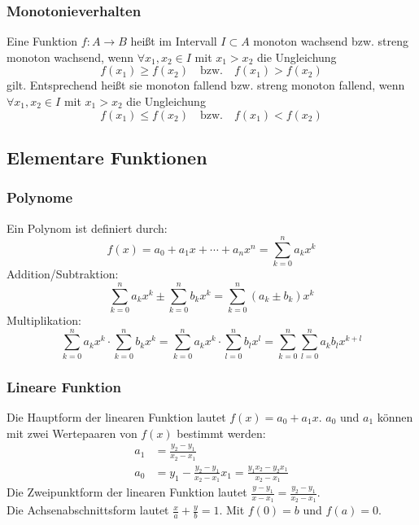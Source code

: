 \subsubsection{Monotonieverhalten}
Eine Funktion $f: A \rightarrow B$ heißt im Intervall $I \subset A$ monoton wachsend bzw. streng monoton wachsend, wenn $\forall x_1,x_2 \in I$ mit $x_1 > x_2$ die Ungleichung 
$$f(x_1) \geq f(x_2) \quad \text{bzw.} \quad f(x_1) > f(x_2)$$
gilt. Entsprechend heißt sie monoton fallend bzw. streng monoton fallend, wenn $\forall x_1,x_2 \in I$ mit $x_1 > x_2$ die Ungleichung
$$f(x_1) \leq f(x_2) \quad \text{bzw.} \quad f(x_1) < f(x_2)$$
\subsection{Elementare Funktionen}
\subsubsection{Polynome}
Ein Polynom ist definiert durch:
$$f(x) = a_0 + a_1 x + \cdots + a_n x^n = \sum_{k=0}^n a_k x^k$$
Addition/Subtraktion:
$$\sum_{k=0}^n a_k x^k \pm \sum_{k=0}^n b_k x^k = \sum_{k=0}^n (a_k \pm b_k) x^k$$
Multiplikation:
$$\sum_{k=0}^n a_k x^k \cdot \sum_{k=0}^n b_k x^k = \sum_{k=0}^n a_k x^k \cdot \sum_{l=0}^n b_l x^l = \sum_{k=0}^n \sum_{l=0}^n a_k b_l x^{k+l}$$
\subsubsection{Lineare Funktion}
Die Hauptform der linearen Funktion lautet $f(x) = a_0 + a_1 x$. $a_0$ und $a_1$ können mit zwei Wertepaaren von $f(x)$ bestimmt werden:
\begin{align*}
a_1 &= \frac{y_2 - y_1}{x_2 - x_1}\\
a_0 &= y_1 - \frac{y_2 - y_1}{x_2 - x_1}x_1 = \frac{y_1 x_2 - y_2 x_1}{x_2 - x_1}
\end{align*}
Die Zweipunktform der linearen Funktion lautet $\frac{y - y_1}{x - x_1} = \frac{y_2 - y_1}{x_2 - x_1}$.\\
Die Achsenabschnittsform lautet $\frac{x}{a} + \frac{y}{b} = 1$. Mit $f(0) = b$ und $f(a)=0$.
